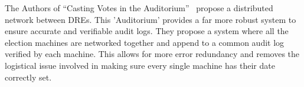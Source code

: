 The Authors of “Casting Votes in the Auditorium”~\cite{Sandler2007} propose a distributed network between DREs.  This 'Auditorium' provides a far more robust system to ensure accurate and verifiable audit logs.  They propose a system where all the election machines are networked together and append to a common audit log verified by each machine.  This allows for more error redundancy and removes the logistical issue involved in making sure every single machine has their date correctly set.
